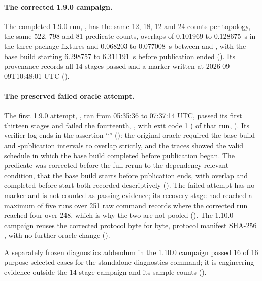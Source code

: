 \paragraph{The corrected 1.9.0 campaign.}
The completed 1.9.0 run, ,
has the same 12, 18, 12 and 24 counts per topology, the same 522, 798 and 81
predicate counts, overlaps of 0.101969 to 0.128675~s in the three-package
fixtures and 0.068203 to 0.077008~s between  and , with
the base build starting 6.298757 to 6.311191~s before  publication
ended (). Its
provenance records all 14 stages passed and a  marker written
at 2026-09-09T10:48:01 UTC
().

\paragraph{The preserved failed oracle attempt.}
The first 1.9.0 attempt, , ran
from 05:35:36 to 07:37:14 UTC, passed its first thirteen stages and failed
the fourteenth, , with exit code 1
( of that run, ). Its verifier
log ends in the assertion ``'' (): the original oracle
required the base-build and -publication intervals to overlap
strictly, and the traces showed the valid schedule in which the base build
completed before  publication began. The predicate was corrected
before the full rerun to the dependency-relevant condition, that the base
build starts before  publication ends, with overlap and
completed-before-start both recorded descriptively
(). The failed attempt has no  marker
and is not counted as passing evidence; its recovery stage had reached a
maximum of five runs over 251 raw command records where the corrected run
reached four over 248, which is why the two are not pooled
(). The 1.10.0 campaign reuses the
corrected protocol byte for byte, protocol manifest SHA-256
, with
no further oracle change ().

A separately frozen diagnostics addendum in the 1.10.0 campaign passed 16 of
16 purpose-selected cases for the standalone diagnostics command; it is
engineering evidence outside the 14-stage campaign and its sample counts
().

